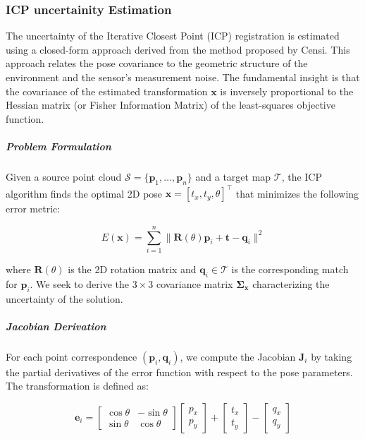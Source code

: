 \documentclass[11pt]{article}
\begin{document}
\subsubsection{ICP uncertainity Estimation}

The uncertainty of the Iterative Closest Point (ICP) registration is estimated using a closed-form approach derived from the method proposed by Censi\cite{censi}. This approach relates the pose covariance to the geometric structure of the environment and the sensor's measurement noise. The fundamental insight is that the covariance of the estimated transformation $\mathbf{x}$ is inversely proportional to the Hessian matrix (or Fisher Information Matrix) of the least-squares objective function.

\subparagraph{Problem Formulation}
Given a source point cloud $\mathcal{S} = \{\mathbf{p}_1, \dots, \mathbf{p}_n\}$ and a target map $\mathcal{T}$, the ICP algorithm finds the optimal 2D pose $\mathbf{x} = [t_x, t_y, \theta]^\top$ that minimizes the following error metric:

\begin{equation}
	E(\mathbf{x}) = \sum_{i=1}^{n} \| \mathbf{R}(\theta) \mathbf{p}_i + \mathbf{t} - \mathbf{q}_i \|^2
\end{equation}

where $\mathbf{R}(\theta)$ is the 2D rotation matrix and $\mathbf{q}_i \in \mathcal{T}$ is the corresponding match for $\mathbf{p}_i$. We seek to derive the $3 \times 3$ covariance matrix $\mathbf{\Sigma}_{\mathbf{x}}$ characterizing the uncertainty of the solution.

\subparagraph{Jacobian Derivation}
For each point correspondence $(\mathbf{p}_i, \mathbf{q}_i)$, we compute the Jacobian $\mathbf{J}_i$ by taking the partial derivatives of the error function with respect to the pose parameters. The transformation is defined as:

\begin{equation}
	\mathbf{e}_i = \begin{bmatrix} \cos \theta & -\sin \theta \\ \sin \theta & \cos \theta \end{bmatrix} \begin{bmatrix} p_x \\ p_y \end{bmatrix} + \begin{bmatrix} t_x \\ t_y \end{bmatrix} - \begin{bmatrix} q_x \\ q_y \end{bmatrix} 
\end{equation}
\end{document}
